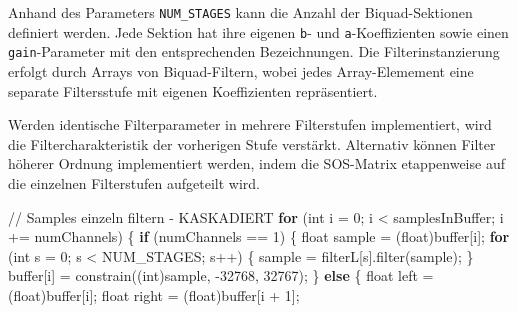 \documentclass[
  ngerman,
  letterpaper,
  DIV=11]{scrreprt}
\newenvironment{Shaded}{\begin{snugshade}}{\end{snugshade}}
\newcommand{\CommentTok}[1]{\textcolor[rgb]{0.37,0.37,0.37}{#1}}
\newcommand{\ControlFlowTok}[1]{\textcolor[rgb]{0.00,0.23,0.31}{\textbf{#1}}}
\newcommand{\DataTypeTok}[1]{\textcolor[rgb]{0.68,0.00,0.00}{#1}}
\newcommand{\DecValTok}[1]{\textcolor[rgb]{0.68,0.00,0.00}{#1}}
\newcommand{\NormalTok}[1]{\textcolor[rgb]{0.00,0.23,0.31}{#1}}
\newcommand{\OperatorTok}[1]{\textcolor[rgb]{0.37,0.37,0.37}{#1}}
\begin{document}
Anhand des Parameters \texttt{NUM\_STAGES} kann die Anzahl der
Biquad-Sektionen definiert werden. Jede Sektion hat ihre eigenen
\texttt{b}- und \texttt{a}-Koeffizienten sowie einen
\texttt{gain}-Parameter mit den entsprechenden Bezeichnungen. Die
Filterinstanzierung erfolgt durch Arrays von Biquad-Filtern, wobei jedes
Array-Elemement eine separate Filtersstufe mit eigenen Koeffizienten
repräsentiert.

Werden identische Filterparameter in mehrere Filterstufen implementiert,
wird die Filtercharakteristik der vorherigen Stufe verstärkt. Alternativ
können Filter höherer Ordnung implementiert werden, indem die SOS-Matrix
etappenweise auf die einzelnen Filterstufen aufgeteilt wird.

\begin{Shaded}
\begin{Highlighting}[]
\CommentTok{// Samples einzeln filtern {-} KASKADIERT}
\ControlFlowTok{for} \OperatorTok{(}\DataTypeTok{int}\NormalTok{ i }\OperatorTok{=} \DecValTok{0}\OperatorTok{;}\NormalTok{ i }\OperatorTok{\textless{}}\NormalTok{ samplesInBuffer}\OperatorTok{;}\NormalTok{ i }\OperatorTok{+=}\NormalTok{ numChannels}\OperatorTok{)} \OperatorTok{\{}
  \ControlFlowTok{if} \OperatorTok{(}\NormalTok{numChannels }\OperatorTok{==} \DecValTok{1}\OperatorTok{)} \OperatorTok{\{}
    \DataTypeTok{float}\NormalTok{ sample }\OperatorTok{=} \OperatorTok{(}\DataTypeTok{float}\OperatorTok{)}\NormalTok{buffer}\OperatorTok{[}\NormalTok{i}\OperatorTok{];}
    \ControlFlowTok{for} \OperatorTok{(}\DataTypeTok{int}\NormalTok{ s }\OperatorTok{=} \DecValTok{0}\OperatorTok{;}\NormalTok{ s }\OperatorTok{\textless{}}\NormalTok{ NUM\_STAGES}\OperatorTok{;}\NormalTok{ s}\OperatorTok{++)} \OperatorTok{\{}
\NormalTok{      sample }\OperatorTok{=}\NormalTok{ filterL}\OperatorTok{[}\NormalTok{s}\OperatorTok{].}\NormalTok{filter}\OperatorTok{(}\NormalTok{sample}\OperatorTok{);}
    \OperatorTok{\}}
\NormalTok{    buffer}\OperatorTok{[}\NormalTok{i}\OperatorTok{]} \OperatorTok{=}\NormalTok{ constrain}\OperatorTok{((}\DataTypeTok{int}\OperatorTok{)}\NormalTok{sample}\OperatorTok{,} \OperatorTok{{-}}\DecValTok{32768}\OperatorTok{,} \DecValTok{32767}\OperatorTok{);}
  \OperatorTok{\}}
  \ControlFlowTok{else} \OperatorTok{\{}
    \DataTypeTok{float}\NormalTok{ left }\OperatorTok{=} \OperatorTok{(}\DataTypeTok{float}\OperatorTok{)}\NormalTok{buffer}\OperatorTok{[}\NormalTok{i}\OperatorTok{];}
    \DataTypeTok{float}\NormalTok{ right }\OperatorTok{=} \OperatorTok{(}\DataTypeTok{float}\OperatorTok{)}\NormalTok{buffer}\OperatorTok{[}\NormalTok{i }\OperatorTok{+} \DecValTok{1}\OperatorTok{];}

\end{Highlighting}
\end{Shaded}
\end{document}

